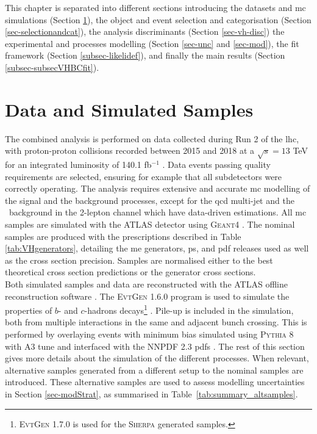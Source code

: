This chapter is separated into different sections introducing the datasets and \gls{mc} simulations (Section \ref{sec-datasets}), the object and event selection and categorisation (Section \ref{sec-selectionandcat}), the analysis discriminants (Section \ref{sec-vh-disc}) the experimental and processes modelling (Section \ref{sec-unc} and \ref{sec-mod}), the fit framework (Section \ref{subsec-likelidef}), and finally the main results (Section \ref{subsec-subsecVHBCfit}).

\section{Data and Simulated Samples}\label{sec-datasets} 
The combined analysis is performed on data collected during Run 2 of the \gls{lhc}, with proton-proton collisions recorded between 2015 and 2018 at a $\sqrt{s} = 13$ TeV for an integrated luminosity of 140.1 fb$^{-1}$ \cite{ATLAS:2022hro}. Data events passing quality requirements are selected, ensuring for example that all subdetectors were correctly operating. The analysis requires extensive and accurate \gls{mc} modelling of the signal and the background processes, except for the \gls{qcd} multi-jet and the \ttb\ background in the 2-lepton channel which have data-driven estimations. All \gls{mc} samples are simulated with the ATLAS detector \cite{ATLASSimulationInfra} using \textsc{Geant4} \cite{Agostinelli:602040}. The nominal samples are produced with the prescriptions described in Table \ref{tab:VHgenerators}, detailing the \gls{me} generators, \gls{ps}, and \gls{pdf} releases used as well as the cross section precision. Samples are normalised either to the best theoretical cross section predictions or the generator cross sections. \\



Both simulated samples and data are reconstructed with the ATLAS offline reconstruction software \cite{ATL-SOFT-PUB-2021-001}. The \textsc{EvtGen} 1.6.0 program is used to simulate the properties of $b$- and $c$-hadrons decays\footnote{\textsc{EvtGen} 1.7.0 is used for the \textsc{Sherpa} generated samples.} \cite{LANGE2001152}. Pile-up is included in the simulation, both from multiple interactions in the same and adjacent bunch crossing. This is performed by overlaying events with minimum bias simulated using \textsc{\textsc{Pythia}} 8 with A3 tune and interfaced with the \textsc{NNPDF} 2.3 \glspl{pdf} \cite{SJOSTRAND2015159}. The rest of this section gives more details about the simulation of the different processes. When relevant, alternative samples generated from a different setup to the nominal samples are introduced. These alternative samples are used to assess modelling uncertainties in Section \ref{sec-modStrat}, as summarised in Table~\ref{tab:summary_altsamples}.

